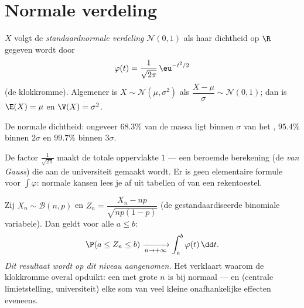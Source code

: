 \section{Normale verdeling}

\begin{definition}\label{def:g12:contdist:normal}
$X$ volgt de \emph{standaardnormale verdeling}
$\mathcal N(0, 1)$ als haar dichtheid op $\R$ gegeven wordt door
\[
\varphi(t) = \frac{1}{\sqrt{2\pi}}\,\eu^{-t^2/2}
\]
(de klokkromme). Algemener is $X \sim \mathcal N(\mu, \sigma^2)$ als
$\dfrac{X - \mu}{\sigma} \sim \mathcal N(0,1)$; dan is $\E(X) = \mu$ en
$\V(X) = \sigma^2$.
\end{definition}

\begin{omfigure}

{\small De normale dichtheid: ongeveer $68.3\%$ van de massa ligt binnen
$\sigma$ van het , $95.4\%$ binnen $2\sigma$ en $99.7\%$ binnen
$3\sigma$.}
\end{omfigure}

\begin{remark}
De factor $\frac{1}{\sqrt{2\pi}}$ maakt de totale oppervlakte $1$ --- een
beroemde berekening (de \emph{ van Gauss}) die aan de universiteit
gemaakt wordt. Er is geen elementaire formule voor $\int \varphi$: normale
kansen lees je af uit tabellen of van een rekentoestel.
\end{remark}

\begin{theorem}\label{thm:g12:contdist:tcl}
Zij $X_n \sim \mathcal B(n, p)$ en $Z_n = \dfrac{X_n - np}{\sqrt{np(1-p)}}$
(de gestandaardiseerde binomiale variabele). Dan geldt voor alle
$a \leq b$:
\[
\P(a \leq Z_n \leq b) \xrightarrow[n\to+\infty]{}
\int_a^b \varphi(t)\,\dd t .
\]
\emph{Dit resultaat wordt op dit niveau aangenomen.} Het verklaart waarom de
klokkromme overal opduikt: een  met grote $n$ is bij
 normaal --- en (centrale limietstelling, universiteit) elke som van
veel kleine onafhankelijke effecten eveneens.
\end{theorem}


